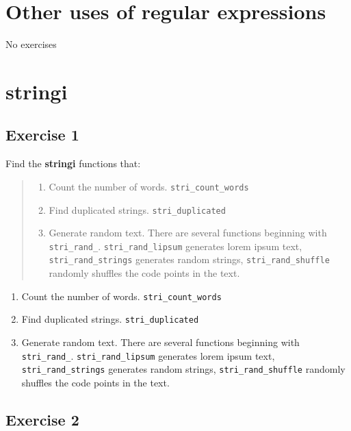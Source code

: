\documentclass[]{book}
\providecommand{\tightlist}{%
  \setlength{\itemsep}{0pt}\setlength{\parskip}{0pt}}
\theoremstyle{definition}
\theoremstyle{definition}
\theoremstyle{definition}
\theoremstyle{remark}
\begin{document}
\hypertarget{other-uses-of-regular-expressions}{%
\section{Other uses of regular
expressions}\label{other-uses-of-regular-expressions}}

No exercises

\hypertarget{stringi}{%
\section{stringi}\label{stringi}}

\hypertarget{exercise-1-37}{%
\subsection{Exercise 1}\label{exercise-1-37}}

Find the \textbf{stringi} functions that:

\begin{quote}
\begin{enumerate}
\def\labelenumi{\arabic{enumi}.}
\tightlist
\item
  Count the number of words. \texttt{stri\_count\_words}
\item
  Find duplicated strings. \texttt{stri\_duplicated}
\item
  Generate random text. There are several functions beginning with
  \texttt{stri\_rand\_}. \texttt{stri\_rand\_lipsum} generates lorem
  ipsum text, \texttt{stri\_rand\_strings} generates random strings,
  \texttt{stri\_rand\_shuffle} randomly shuffles the code points in the
  text.
\end{enumerate}
\end{quote}

\begin{enumerate}
\def\labelenumi{\arabic{enumi}.}
\tightlist
\item
  Count the number of words. \texttt{stri\_count\_words}
\item
  Find duplicated strings. \texttt{stri\_duplicated}
\item
  Generate random text. There are several functions beginning with
  \texttt{stri\_rand\_}. \texttt{stri\_rand\_lipsum} generates lorem
  ipsum text, \texttt{stri\_rand\_strings} generates random strings,
  \texttt{stri\_rand\_shuffle} randomly shuffles the code points in the
  text.
\end{enumerate}

\hypertarget{exercise-2-36}{%
\subsection{Exercise 2}\label{exercise-2-36}}
\end{document}
